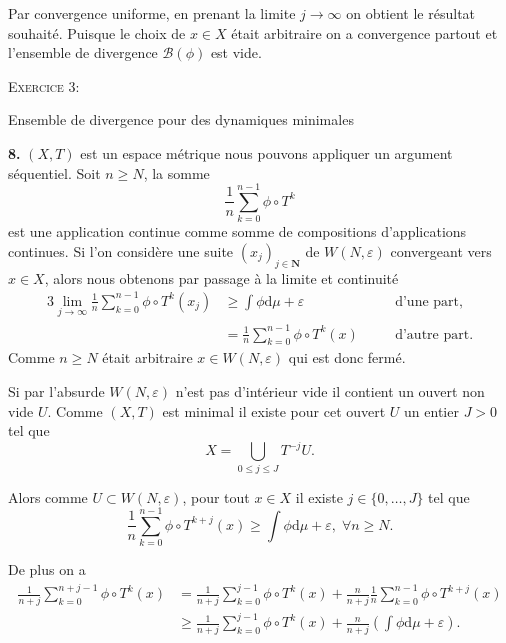 \documentclass[12pt]{article}
\newenvironment{ex}[1]
{\begin{mdframed}[linewidth=0.6pt]
        \textsc{Exercice #1:}

}
    {\end{mdframed}}
\newcommand{\N}{\mathbf{N}}
\newcommand{\de}{\mathrm{d}}
\begin{document}
Par convergence uniforme, en prenant la limite $j \to \infty$ on obtient le résultat souhaité. Puisque le choix de $x \in X$ était arbitraire on a convergence partout et l'ensemble de divergence $\mathcal{B}(\phi)$ est vide.

\bigskip

\begin{ex}{3}
        Ensemble de divergence pour des dynamiques minimales 
\end{ex}

\textbf{8.} $(X,T)$ est un espace métrique nous pouvons appliquer un argument séquentiel. Soit $n \ge N$, la somme \[
\frac{1}{n}\sum_{k=0}^{n-1} \phi\circ T^{k}
\] est une application continue comme somme de compositions d'applications continues. Si l'on considère une suite $(x_{j})_{j\in\N}$ de $W(N, \varepsilon)$ convergeant vers $x \in X$, alors nous obtenons par passage à la limite et continuité 
\begin{alignat*}{3}
        \lim_{j\to \infty}\frac{1}{n}\sum_{k=0}^{n-1} \phi\circ T^{k}(x_{j}) &\ge \int\phi\de\mu + \varepsilon \quad &&\text{d'une part,} \\
                                                                             &= \frac{1}{n}\sum_{k=0}^{n-1} \phi\circ T^{k}(x) \quad &&\text{d'autre part}
.\end{alignat*}
Comme $n \ge N$ était arbitraire $x \in W(N,\varepsilon)$ qui est donc fermé.

\medskip

Si par l'absurde $W(N,\varepsilon)$ n'est pas d'intérieur vide il contient un ouvert non vide $U$. Comme $(X,T)$ est minimal il existe pour cet ouvert  $U$ un entier $J > 0$ tel que  \[
X = \bigcup_{0\le j \le J}T^{-j}U
.\] 

Alors comme $U \subset W(N,\varepsilon)$, pour tout $x \in X$ il existe $j \in \{0, \ldots, J\}$ tel que \[
        \frac{1}{n}\sum_{k=0}^{n-1} \phi\circ T^{k+j}(x) \ge \int\phi\de\mu + \varepsilon, \; \forall n \ge N
.\] 

De plus on a
\begin{align*}
        \frac{1}{n+j}\sum_{k=0}^{n+j-1} \phi\circ T^{k}(x) &= \frac{1}{n+j}\sum_{k=0}^{j-1} \phi\circ T^{k}(x) + \frac{n}{n+j}\frac{1}{n}\sum_{k=0}^{n-1} \phi\circ T^{k+j}(x) \\
                                                           &\ge \frac{1}{n+j}\sum_{k=0}^{j-1} \phi\circ T^{k}(x) + \frac{n}{n+j}(\int\phi\de\mu + \varepsilon)
.\end{align*}
\end{document}
